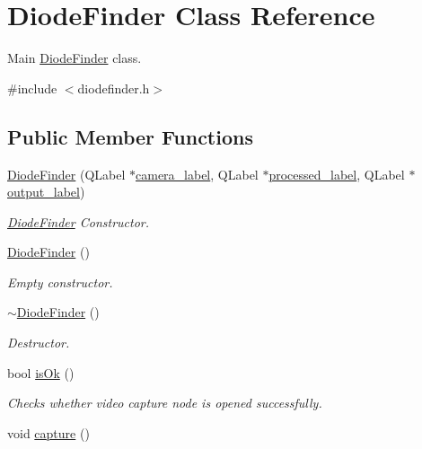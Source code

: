 \hypertarget{classDiodeFinder}{\section{\-Diode\-Finder \-Class \-Reference}
\label{classDiodeFinder}
}


\-Main \hyperlink{classDiodeFinder}{\-Diode\-Finder} class.  




{\ttfamily \#include $<$diodefinder.\-h$>$}

\subsection*{\-Public \-Member \-Functions}
\begin{DoxyCompactItemize}
\item 
\hyperlink{classDiodeFinder_a898dc874b4f8395b70508e5bcea528a8}{\-Diode\-Finder} (\-Q\-Label $\ast$\hyperlink{classDiodeFinder_aec17871d18595315f121c7f7e0cec985}{camera\-\_\-label}, \-Q\-Label $\ast$\hyperlink{classDiodeFinder_abc59dcea66433ca0ae0f2baab2d768eb}{processed\-\_\-label}, \-Q\-Label $\ast$\hyperlink{classDiodeFinder_a80896a062265941aef7a43bac48fb748}{output\-\_\-label})
\begin{DoxyCompactList}\small\item\em \hyperlink{classDiodeFinder}{\-Diode\-Finder} \-Constructor. \end{DoxyCompactList}\item 
\hypertarget{classDiodeFinder_a84ff5cee670565eebb2aaf3d31222c0d}{\hyperlink{classDiodeFinder_a84ff5cee670565eebb2aaf3d31222c0d}{\-Diode\-Finder} ()}\label{classDiodeFinder_a84ff5cee670565eebb2aaf3d31222c0d}

\begin{DoxyCompactList}\small\item\em \-Empty constructor. \end{DoxyCompactList}\item 
\hypertarget{classDiodeFinder_a40a14a6b4f7c190e93edb50f34572b15}{\hyperlink{classDiodeFinder_a40a14a6b4f7c190e93edb50f34572b15}{$\sim$\-Diode\-Finder} ()}\label{classDiodeFinder_a40a14a6b4f7c190e93edb50f34572b15}

\begin{DoxyCompactList}\small\item\em \-Destructor. \end{DoxyCompactList}\item 
bool \hyperlink{classDiodeFinder_a41adea8693a8e81dbf61a36c39c91dd6}{is\-Ok} ()
\begin{DoxyCompactList}\small\item\em \-Checks whether video capture node is opened successfully. \end{DoxyCompactList}\item 
\hypertarget{classDiodeFinder_a71a80a3fdf18af14e2616220d2cba861}{void \hyperlink{classDiodeFinder_a71a80a3fdf18af14e2616220d2cba861}{capture} ()}\label{classDiodeFinder_a71a80a3fdf18af14e2616220d2cba861}


\end{DoxyCompactItemize}
